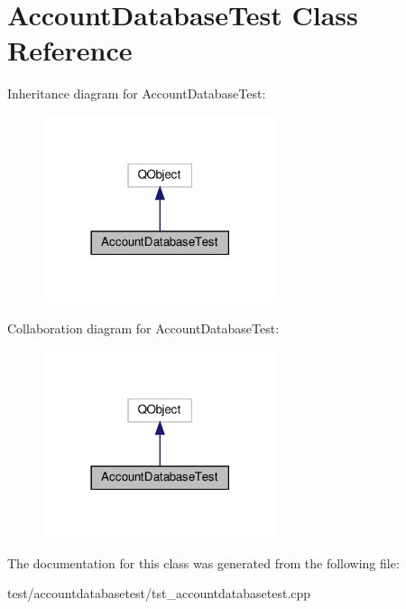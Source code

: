 \hypertarget{classAccountDatabaseTest}{}\section{Account\+Database\+Test Class Reference}
\label{classAccountDatabaseTest}


Inheritance diagram for Account\+Database\+Test\+:
\nopagebreak
\begin{figure}[H]
\begin{center}
\leavevmode
\includegraphics[width=194pt]{classAccountDatabaseTest__inherit__graph}
\end{center}
\end{figure}


Collaboration diagram for Account\+Database\+Test\+:
\nopagebreak
\begin{figure}[H]
\begin{center}
\leavevmode
\includegraphics[width=194pt]{classAccountDatabaseTest__coll__graph}
\end{center}
\end{figure}


The documentation for this class was generated from the following file\+:\begin{DoxyCompactItemize}
\item 
test/accountdatabasetest/tst\+\_\+accountdatabasetest.\+cpp\end{DoxyCompactItemize}
